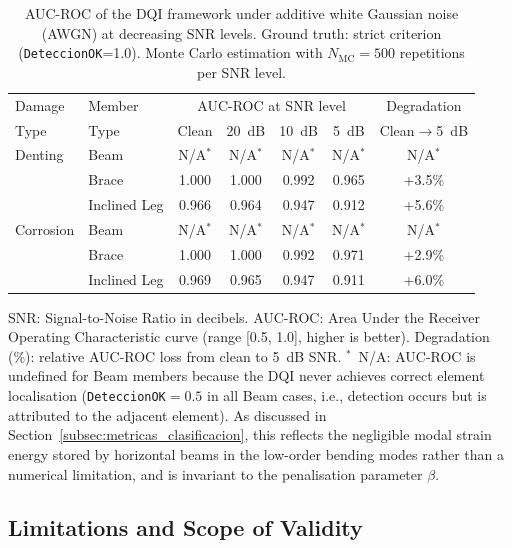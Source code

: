 \documentclass[a4paper,fleqn,nologo]{cas-dc}
\begin{document}
\clearpage
\begin{table}[!ht]
  \centering
  \caption{AUC-ROC of the DQI framework under additive white Gaussian noise (AWGN) at decreasing SNR levels. Ground truth: strict criterion (\texttt{DeteccionOK}=1.0). Monte Carlo estimation with $N_{\text{MC}}=500$ repetitions per SNR level.}
  \label{tab:snr_robustness}
  \begin{tabular}{llccccc}
    \toprule
    Damage & Member & \multicolumn{4}{c}{AUC-ROC at SNR level} & Degradation \\
    Type & Type & Clean & 20~dB & 10~dB & 5~dB & Clean$\to$5~dB \\
    \midrule
    Denting & Beam & N/A$^*$ & N/A$^*$ & N/A$^*$ & N/A$^*$ & N/A$^*$ \\
     & Brace & 1.000 & 1.000 & 0.992 & 0.965 & +3.5\% \\
     & Inclined Leg & 0.966 & 0.964 & 0.947 & 0.912 & +5.6\% \\
    \midrule
    Corrosion & Beam & N/A$^*$ & N/A$^*$ & N/A$^*$ & N/A$^*$ & N/A$^*$ \\
     & Brace & 1.000 & 1.000 & 0.992 & 0.971 & +2.9\% \\
     & Inclined Leg & 0.969 & 0.965 & 0.947 & 0.911 & +6.0\% \\
    \bottomrule
  \end{tabular}
  \par\smallskip
  {\footnotesize\raggedright
  SNR: Signal-to-Noise Ratio in decibels. AUC-ROC: Area Under the Receiver
  Operating Characteristic curve (range [0.5, 1.0], higher is better).
  Degradation (\%): relative AUC-ROC loss from clean to 5~dB SNR.
  $^*$~N/A: AUC-ROC is undefined for Beam members because the DQI never achieves
  correct element localisation (\texttt{DeteccionOK}$=0.5$ in all Beam cases, i.e.,
  detection occurs but is attributed to the adjacent element). As discussed in
  Section~\ref{subsec:metricas_clasificacion}, this reflects the negligible modal strain
  energy stored by horizontal beams in the low-order bending modes rather than a numerical
  limitation, and is invariant to the penalisation parameter $\beta$.
  \par}
\end{table}

\FloatBarrier
\subsection{Limitations and Scope of Validity}
\label{subsec:limitaciones}
\end{document}
